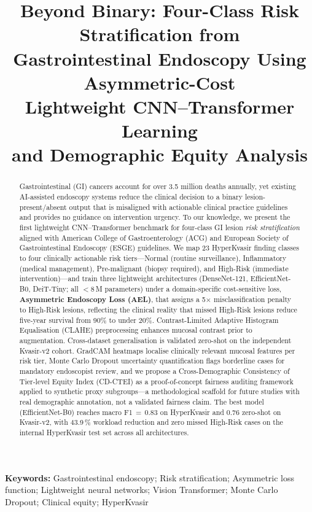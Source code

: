 \documentclass[11pt,a4paper]{article}
\title{\textbf{Beyond Binary: Four-Class Risk Stratification from\\
Gastrointestinal Endoscopy Using Asymmetric-Cost\\
Lightweight CNN--Transformer Learning\\
and Demographic Equity Analysis}}
\author{}
\date{}
\begin{document}
\maketitle

\begin{abstract}
Gastrointestinal (GI) cancers account for over 3.5 million deaths annually,
yet existing AI-assisted endoscopy systems reduce the clinical decision to a
binary lesion-present/absent output that is misaligned with actionable
clinical practice guidelines and provides no guidance on intervention urgency.
To our knowledge, we present the first lightweight CNN--Transformer benchmark
for four-class GI lesion \emph{risk stratification} aligned with American
College of Gastroenterology (ACG) and European Society of Gastrointestinal
Endoscopy (ESGE) guidelines. We map 23 HyperKvasir finding classes to four clinically
actionable risk tiers---Normal (routine surveillance), Inflammatory (medical
management), Pre-malignant (biopsy required), and High-Risk (immediate
intervention)---and train three lightweight architectures (DenseNet-121,
EfficientNet-B0, DeiT-Tiny; all $<$8\,M parameters) under a domain-specific cost-sensitive loss,
\textbf{Asymmetric Endoscopy Loss (AEL)}, that assigns a 5$\times$
misclassification penalty to High-Risk lesions, reflecting the clinical
reality that missed High-Risk lesions reduce five-year survival from 90\% to
under 20\%. Contrast-Limited Adaptive Histogram Equalisation (CLAHE)
preprocessing enhances mucosal contrast prior to augmentation. Cross-dataset
generalisation is validated zero-shot on the independent Kvasir-v2 cohort.
GradCAM heatmaps localise clinically relevant mucosal features per risk tier,
Monte Carlo Dropout uncertainty quantification flags borderline cases for
mandatory endoscopist review, and we propose a Cross-Demographic
Consistency of Tier-level Equity Index (CD-CTEI) as a proof-of-concept
fairness auditing framework applied to synthetic proxy subgroups---a
methodological scaffold for future studies with real demographic annotation,
not a validated fairness claim. The best model (EfficientNet-B0) reaches macro
F1\,$=$\,0.83 on HyperKvasir and 0.76 zero-shot on Kvasir-v2, with 43.9\,\%
workload reduction and zero missed High-Risk cases on the internal HyperKvasir test set across all architectures.
\end{abstract}

\noindent\textbf{Keywords:}
Gastrointestinal endoscopy;
Risk stratification;
Asymmetric loss function;
Lightweight neural networks;
Vision Transformer;
Monte Carlo Dropout;
Clinical equity;
HyperKvasir
\end{document}
